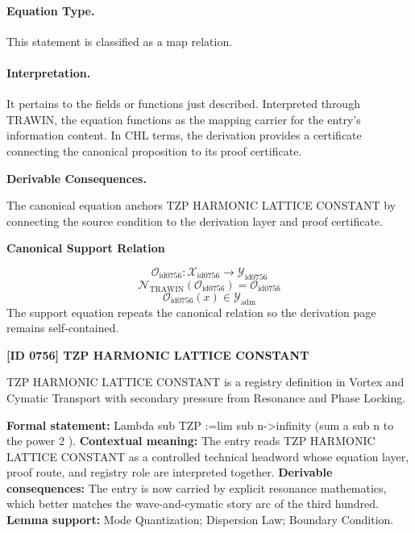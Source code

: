 \paragraph{Equation Type.}
This statement is classified as a map relation.

\paragraph{Interpretation.}
It pertains to the fields or functions just described. Interpreted through TRAWIN, the equation functions as the mapping carrier for the entry’s information content. In CHL terms, the derivation provides a certificate connecting the canonical proposition to its proof certificate.

\par\vspace{0.35em}
\noindent\textbf{Derivable Consequences.}\quad
\begingroup
\footnotesize
\raggedright
The canonical equation anchors TZP HARMONIC LATTICE CONSTANT by connecting the source condition to the derivation layer and proof certificate.
\par\endgroup

\noindent\textbf{Canonical Support Relation}\par
\[
\mathcal{O}_{\mathrm{id0756}}:\mathcal{X}_{\mathrm{id0756}}\longrightarrow\mathcal{Y}_{\mathrm{id0756}}
\]
\[
\mathcal{N}_{\mathrm{TRAWIN}}(\mathcal{O}_{\mathrm{id0756}})=\mathcal{O}_{\mathrm{id0756}}
\]
\[
\mathcal{O}_{\mathrm{id0756}}(x)\in\mathcal{Y}_{\mathrm{adm}}
\]
\noindent The support equation repeats the canonical relation so the derivation page remains self-contained.\par

\clearpage
\noindent\textbf{[ID 0756] TZP HARMONIC LATTICE CONSTANT}\par
\vspace{0.35em}
\begingroup\small
{}
TZP HARMONIC LATTICE CONSTANT is a registry definition in Vortex and Cymatic Transport with secondary pressure from Resonance and Phase Locking.

\begingroup\footnotesize\setlength{\emergencystretch}{3em}\sloppy
\textbf{Formal statement:} Lambda sub TZP :=lim sub n->infinity (sum a sub n to the power 2 ). \textbf{Contextual meaning:} The entry reads TZP HARMONIC LATTICE CONSTANT as a controlled technical headword whose equation layer, proof route, and registry role are interpreted together. \textbf{Derivable consequences:} The entry is now carried by explicit resonance mathematics, which better matches the wave-and-cymatic story arc of the third hundred. \textbf{Lemma support:} Mode Quantization; Dispersion Law; Boundary Condition.\par
\endgroup

